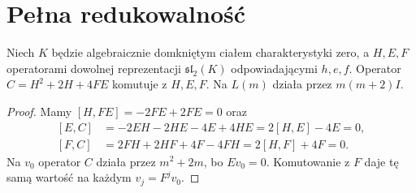 \section{Pełna redukowalność}
\begin{lemat}
\label{aa:lem:sl2-casimir}
Niech $K$ będzie algebraicznie domkniętym ciałem charakterystyki zero, a $H,E,F$ operatorami dowolnej reprezentacji $\mathfrak{sl}_2(K)$ odpowiadającymi $h,e,f$. Operator $C=H^2+2H+4FE$ komutuje z $H,E,F$. Na $L(m)$ działa przez $m(m+2)I$.
\end{lemat}
\begin{proof}
Mamy $[H,FE]=-2FE+2FE=0$ oraz
\[
\begin{aligned}
 [E,C]&=-2EH-2HE-4E+4HE=2[H,E]-4E=0,\\
 [F,C]&=2FH+2HF+4F-4FH=2[H,F]+4F=0.
\end{aligned}
\]
Na $v_0$ operator $C$ działa przez $m^2+2m$, bo $Ev_0=0$. Komutowanie z $F$ daje tę samą wartość na każdym $v_j=F^jv_0$.
\end{proof}

